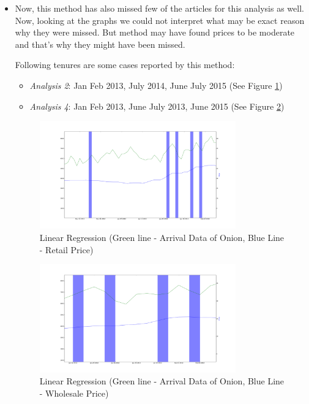 \begin{itemize}
			
			
			\item Now, this method has also missed few of the articles for this analysis as well. Now, looking at the graphs we could not interpret what may be exact reason why they were missed. But method may have found prices to be moderate and that's why they might have been missed.
			
			Following tenures are some cases reported by this method:
			\begin{itemize}
				\item \textit{Analysis 2}: Jan Feb 2013, July 2014, June July 2015 (See Figure \ref{fig:12222})
				\item \textit{Analysis 4}: Jan Feb 2013, June July 2013, June 2015 (See Figure \ref{fig:12242})
			\end{itemize}
			\begin{figure}[H]
		    	\centering
  		    	\includegraphics[width=0.8\textwidth]{graphs/12222.png}
		    	\caption{Linear Regression (Green line - Arrival Data of Onion, Blue Line - Retail Price)}
		    	\label{fig:12222}
			\end{figure}
			
			\begin{figure}[H]
		    	\centering
  		    	\includegraphics[width=0.8\textwidth]{graphs/12242.png}
		    	\caption{Linear Regression (Green line - Arrival Data of Onion, Blue Line - Wholesale Price)}
		    	\label{fig:12242}
			\end{figure}
		\end{itemize}

